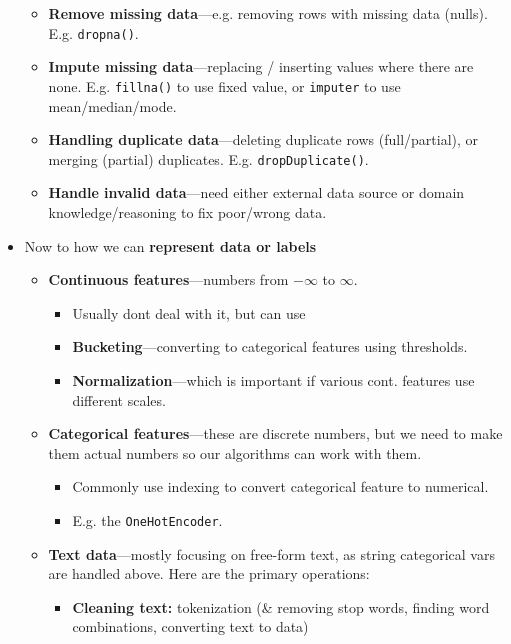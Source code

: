 \begin{multicols}{2}
\begin{itemize}
  \begin{itemize}
    \item
    \textbf{Remove missing data}---e.g. removing rows with missing data
    (nulls). E.g. \texttt{dropna()}.
  \item
    \textbf{Impute missing data}---replacing / inserting values where
    there are none. E.g. \texttt{fillna()} to use fixed value, or
    \texttt{imputer} to use mean/median/mode.
  \item
    \textbf{Handling duplicate data}---deleting duplicate rows
    (full/partial), or merging (partial) duplicates. E.g.
    \texttt{dropDuplicate()}.
  \item
    \textbf{Handle invalid data}---need either external data source or
    domain knowledge/reasoning to fix poor/wrong data.
  \end{itemize}
\item
  Now to how we can \textbf{represent data or labels}

  \begin{itemize}
    \item
    \textbf{Continuous features}---numbers from {\(- \infty\)} to
    {\(\infty\)}.

    \begin{itemize}
        \item
      Usually don\textquotesingle t deal with it, but can use
    \item
      \textbf{Bucketing}---converting to categorical features using
      thresholds.
    \item
      \textbf{Normalization}---which is important if various cont.
      features use different scales.
    \end{itemize}
  \item
    \textbf{Categorical features}---these are discrete numbers, but we
    need to make them actual numbers so our algorithms can work with
    them.

    \begin{itemize}
        \item
      Commonly use indexing to convert categorical feature to numerical.
    \item
      E.g. the \texttt{OneHotEncoder}.
    \end{itemize}
  \item
    \textbf{Text data}---mostly focusing on free-form text, as string
    categorical vars are handled above. Here are the primary operations:

    \begin{itemize}
        \item
      \textbf{Cleaning text:} tokenization (\& removing stop words,
      finding word combinations, converting text to data)


\end{itemize}
\end{itemize}
\end{itemize}
\end{multicols}
